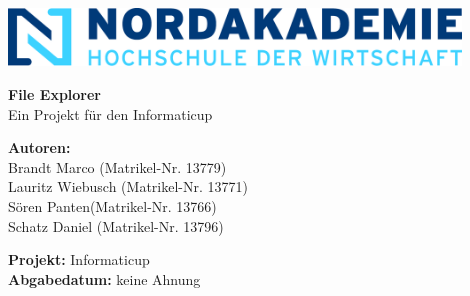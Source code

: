 \begin{titlepage}
    \begin{center}

        \includegraphics[width=0.9\textwidth]{images/Nordakademie_Logo.png}
        \vspace{1cm}

        \huge
        \textbf{File Explorer}\\
        Ein Projekt für den Informaticup
        \vspace{0.5cm}
        
        \large
    
        \vspace{1.5cm}
        \textbf{Autoren:}\\
        Brandt Marco (Matrikel-Nr. 13779)\\
        Lauritz Wiebusch (Matrikel-Nr. 13771)\\
        Sören Panten(Matrikel-Nr. 13766)\\
        Schatz Daniel (Matrikel-Nr. 13796)

        \vspace{1cm}
        \textbf{Projekt:} Informaticup\\
        \textbf{Abgabedatum:} keine Ahnung
        
        \vfill

    \end{center}     
            
\end{titlepage}

